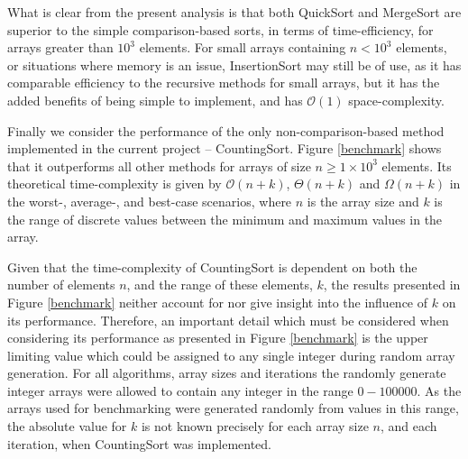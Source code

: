\documentclass[12pt,a4paper]{article}
\begin{document}
What is clear from the present analysis is that both QuickSort and MergeSort are superior to the simple comparison-based sorts, in terms of time-efficiency, for arrays greater than $10^3$ elements. For small arrays containing  $n<10^3$ elements, or situations where memory is an issue, InsertionSort may still be of use, as it has comparable efficiency to the recursive methods for small arrays, but it has the added benefits of being simple to implement, and has $\mathcal{O}(1)$ space-complexity.

Finally we consider the performance of the only non-comparison-based method implemented in the current project -- CountingSort. Figure \ref{benchmark} shows that it outperforms all other methods for arrays of size $n\geq1\times10^3$ elements. Its theoretical time-complexity is given by $\mathcal{O}(n+k)$, $\Theta(n+k)$ and $\Omega(n+k)$ in the worst-, average-, and best-case scenarios, where $n$ is the array size and $k$ is the range of discrete values between the minimum and maximum values in the array.

Given that the time-complexity of CountingSort is dependent on both the number of elements $n$, and the range of these elements, $k$, the results presented in Figure \ref{benchmark} neither account for nor give insight into the influence of $k$ on its performance. Therefore, an important detail which must be considered when considering its performance as presented in Figure \ref{benchmark} is the upper limiting value which could be assigned to any single integer during random array generation. For all algorithms, array sizes and iterations the randomly generate integer arrays were allowed to contain any integer in the range $0-100000$. As the arrays used for benchmarking were generated randomly from values in this range, the absolute value for $k$ is not known precisely for each array size $n$, and each iteration, when CountingSort was implemented.  
\end{document}
